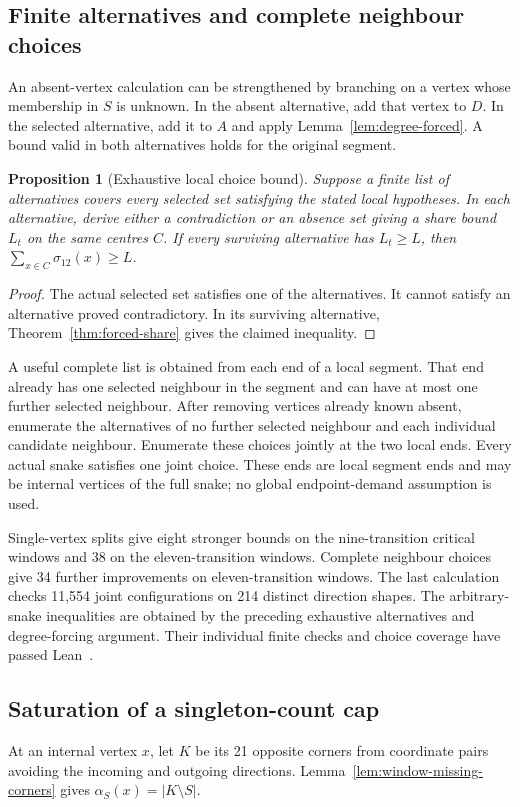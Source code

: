 \documentclass[11pt,a4paper]{article}
\newtheorem{proposition}[theorem]{Proposition}
\theoremstyle{definition}
\theoremstyle{remark}
\begin{document}
\subsection{Finite alternatives and complete neighbour choices}
An absent-vertex calculation can be strengthened by branching on a vertex whose membership in $S$ is unknown. In the absent alternative, add that vertex to $D$. In the selected alternative, add it to $A$ and apply Lemma~\ref{lem:degree-forced}. A bound valid in both alternatives holds for the original segment.

\begin{proposition}[Exhaustive local choice bound]\label{prop:local-choice-share}
Suppose a finite list of alternatives covers every selected set satisfying the stated local hypotheses. In each alternative, derive either a contradiction or an absence set giving a share bound $L_t$ on the same centres $C$. If every surviving alternative has $L_t\ge L$, then $\sum_{x\in C}\sigma_{12}(x)\ge L$.
\end{proposition}
\begin{proof}
The actual selected set satisfies one of the alternatives. It cannot satisfy an alternative proved contradictory. In its surviving alternative, Theorem~\ref{thm:forced-share} gives the claimed inequality.
\end{proof}

A useful complete list is obtained from each end of a local segment. That end already has one selected neighbour in the segment and can have at most one further selected neighbour. After removing vertices already known absent, enumerate the alternatives of no further selected neighbour and each individual candidate neighbour. Enumerate these choices jointly at the two local ends. Every actual snake satisfies one joint choice. These ends are local segment ends and may be internal vertices of the full snake; no global endpoint-demand assumption is used.

Single-vertex splits give eight stronger bounds on the nine-transition critical windows and 38 on the eleven-transition windows. Complete neighbour choices give 34 further improvements on eleven-transition windows. The last calculation checks 11,554 joint configurations on 214 distinct direction shapes. The arbitrary-snake inequalities are obtained by the preceding exhaustive alternatives and degree-forcing argument. Their individual finite checks and choice coverage have passed Lean~\cite{choicearchive}.

\subsection{Saturation of a singleton-count cap}
At an internal vertex $x$, let $K$ be its 21 opposite corners from coordinate pairs avoiding the incoming and outgoing directions. Lemma~\ref{lem:window-missing-corners} gives $\alpha_S(x)=|K\setminus S|$.
\end{document}
